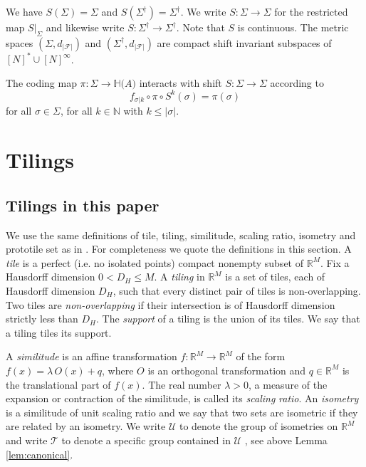 \documentclass{amsproc}
\theoremstyle{plain}
\theoremstyle{definition}
\numberwithin{equation}{section}
\begin{document}
We have $S(\Sigma)=\Sigma$ and $S({\Sigma}^{\dag})={\Sigma}^{\dag}.$ We
write $S:\Sigma\rightarrow\Sigma$ for the restricted map $S|_{\Sigma}$ and
likewise write $S:{\Sigma}^{\dag}\rightarrow{\Sigma}^{\dag}$. Note that $S$
is continuous. The metric spaces $\left( \Sigma,d_{\left\vert \mathcal{F}%
\right\vert }\right) $ and $\left( {\Sigma}^{\dag},d_{\left\vert \mathcal{F}%
\right\vert }\right) $ are compact shift invariant subspaces of $\left[ N%
\right] ^{\ast}\cup\left[ N\right] ^{\infty}$.

The coding map $\pi:\Sigma\rightarrow\mathbb{H(}A)$ interacts with shift $%
S:\Sigma\rightarrow\Sigma$ according to%
\begin{equation*}
f_{\sigma|k}\circ\pi\circ S^{k}\left( \sigma\right) =\pi\left( \sigma\right)
\end{equation*}
for all $\sigma\in\Sigma$, for all $k\in\mathbb{N}$ with $k\leq\left\vert
\sigma\right\vert $.

\section{\label{tilingsec}Tilings}

\subsection{Tilings in this paper}

We use the same definitions of tile, tiling, similitude, scaling ratio,
isometry and prototile set as in \cite{barnsleyvince}. For completeness we
quote the definitions in this section. A \textit{tile} is a perfect (i.e. no
isolated points) compact nonempty subset of $\mathbb{R}^{M}$. Fix a
Hausdorff dimension $0<D_{H}\leq M$. A \textit{tiling} in $\mathbb{R}^{M}$
is a set of tiles, each of Hausdorff dimension $D_{H}$, such that every
distinct pair of tiles is non-overlapping. Two tiles are \textit{%
non-overlapping} if their intersection is of Hausdorff dimension strictly
less than $D_{H}$. The \textit{support} of a tiling is the union of its
tiles. We say that a tiling tiles its support.

A \textit{similitude} is an affine transformation $f:{\mathbb{R}}%
^{M}\rightarrow {\mathbb{R}}^{M}$ of the form $f(x)=\lambda \,O(x)+q$, where 
$O$ is an orthogonal transformation and $q\in \mathbb{R}^{M}$ is the
translational part of $f(x)$. The real number $\lambda >0$, a measure of the
expansion or contraction of the similitude, is called its \textit{scaling} 
\textit{ratio}. An \textit{isometry} is a similitude of unit scaling ratio
and we say that two sets are isometric if they are related by an isometry.
We write $\mathcal{U}$ to denote the group of isometries on $\mathbb{R}^{M}$
and write $\mathcal{T}$ to denote a specific group contained in $\mathcal{U}$%
, see above Lemma \ref{lem:canonical}.
\end{document}
